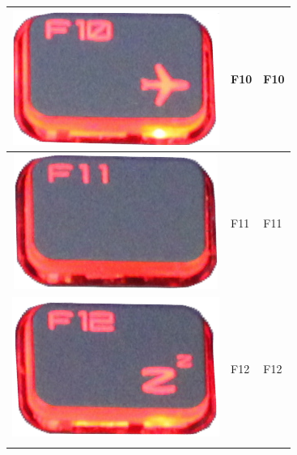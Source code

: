 \begin{longtable}{|cll|}
\hline
\begin{minipage}[c]{.4\textwidth}
\vspace{0.2cm}
\includegraphics[scale=0.08]{Images/KeyMapping/F10}
\vspace{0.2cm}
\end{minipage} & F10 & F10\\
\hline
\begin{minipage}[c]{.4\textwidth}
\vspace{0.2cm}
\includegraphics[scale=0.08]{Images/KeyMapping/F11}
\vspace{0.2cm}
\end{minipage} & F11 & F11\\
\hline
\begin{minipage}[c]{.4\textwidth}
\vspace{0.2cm}
\includegraphics[scale=0.08]{Images/KeyMapping/F12}
\vspace{0.2cm}
\end{minipage} & F12 & F12\\
\hline
\begin{minipage}[c]{.4\textwidth}
\vspace{0.2cm}

\end{minipage}
\end{longtable}
